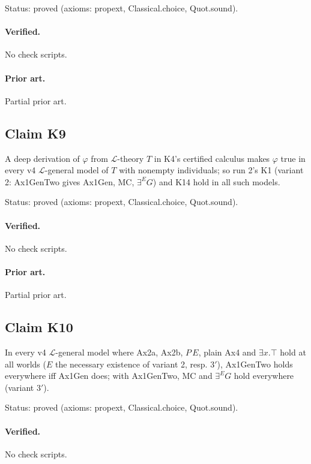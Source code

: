 \documentclass{article}
\begin{document}
Status: proved (axioms: propext, Classical.choice, Quot.sound).

\paragraph{Verified.}
No check scripts.

\paragraph{Prior art.} Partial prior art.

\subsection*{Claim K9}

A deep derivation of $\varphi$ from $\mathcal L$-theory $T$ in K4's certified calculus makes $\varphi$ true in every v4 $\mathcal L$-general model of $T$ with nonempty individuals; so run 2's K1 (variant 2: Ax1GenTwo gives Ax1Gen, MC, $\exists^E G$) and K14 hold in all such models.

Status: proved (axioms: propext, Classical.choice, Quot.sound).

\paragraph{Verified.}
No check scripts.

\paragraph{Prior art.} Partial prior art.

\subsection*{Claim K10}

In every v4 $\mathcal L$-general model where Ax2a, Ax2b, $P\,E$, plain Ax4 and $\exists x.\top$ hold at all worlds ($E$ the necessary existence of variant 2, resp. 3$'$), Ax1GenTwo holds everywhere iff Ax1Gen does; with Ax1GenTwo, MC and $\exists^E G$ hold everywhere (variant 3$'$).

Status: proved (axioms: propext, Classical.choice, Quot.sound).

\paragraph{Verified.}
No check scripts.
\end{document}
